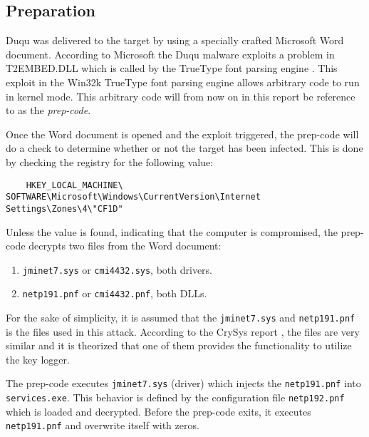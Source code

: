 \documentclass[12pt,english,a4paper]{article}
\begin{document}
\subsection{Preparation}
Duqu was delivered to the target by using a specially crafted Microsoft Word document. According to Microsoft the Duqu malware exploits a problem in T2EMBED.DLL which is called by the TrueType font parsing engine \cite{RYAN_ZDNET}. This exploit in the Win32k TrueType font parsing engine allows arbitrary code to run in kernel mode. This arbitrary code will from now on in this report be reference to as the \textit{prep-code}. 

Once the Word document is opened and the exploit triggered, the prep-code will do a check to determine whether or not the target has been infected. This is done by checking the registry for the following value:
\begin{lstlisting}
    HKEY_LOCAL_MACHINE\ SOFTWARE\Microsoft\Windows\CurrentVersion\Internet Settings\Zones\4\"CF1D" 
\end{lstlisting}
Unless the value is found, indicating that the computer is compromised, the prep-code decrypts two files from the Word document:
 \begin{enumerate}
   \item  \texttt{jminet7.sys} or \texttt{cmi4432.sys}, both drivers.
   \item  \texttt{netp191.pnf} or \texttt{cmi4432.pnf}, both DLLs.
  \end{enumerate}
For the sake of simplicity, it is assumed that the \texttt{jminet7.sys} and \texttt{netp191.pnf} is the files used in this attack. According to the CrySys report \cite{DUQU_BUD}, the files are very similar and it is theorized that one of them provides the functionality to utilize the key logger.

The prep-code executes \texttt{jminet7.sys} (driver) which injects the \texttt{netp191.pnf} into \texttt{services.exe}. This behavior is defined by the configuration file \texttt{netp192.pnf} which is loaded and decrypted. Before the prep-code exits, it executes \texttt{netp191.pnf} and overwrite itself with zeros. 
\end{document}
